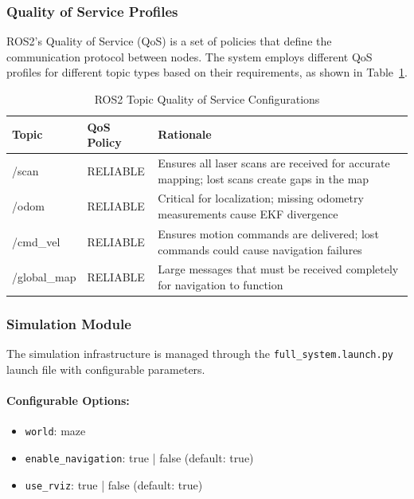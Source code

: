 \documentclass[11pt]{article}
\begin{document}
\subsubsection{Quality of Service Profiles}

ROS2's Quality of Service (QoS) is a set of policies that define the communication protocol between nodes. The system employs different QoS profiles for different topic types based on their requirements, as shown in Table~\ref{tab:qos_profiles}.

\begin{table}[h]
	\centering
	\caption{ROS2 Topic Quality of Service Configurations}
	\label{tab:qos_profiles}
	\begin{tabular}{|l|l|p{7cm}|}
		\hline
		\textbf{Topic} & \textbf{QoS Policy} & \textbf{Rationale} \\ \hline
		/scan & RELIABLE & Ensures all laser scans are received for accurate mapping; lost scans create gaps in the map \\ \hline
		/odom & RELIABLE & Critical for localization; missing odometry measurements cause EKF divergence \\ \hline
		/cmd\_vel & RELIABLE & Ensures motion commands are delivered; lost commands could cause navigation failures \\ \hline
		/global\_map & RELIABLE & Large messages that must be received completely for navigation to function \\ \hline
	\end{tabular}
\end{table}


\subsubsection{Simulation Module}

The simulation infrastructure is managed through the \texttt{full\_system.launch.py} launch file with configurable parameters.

\paragraph{Configurable Options:}
\begin{itemize}
	\item \texttt{world}: maze 
	\item \texttt{enable\_navigation}: true | false (default: true)
	\item \texttt{use\_rviz}: true | false (default: true)
\end{itemize}
\end{document}

